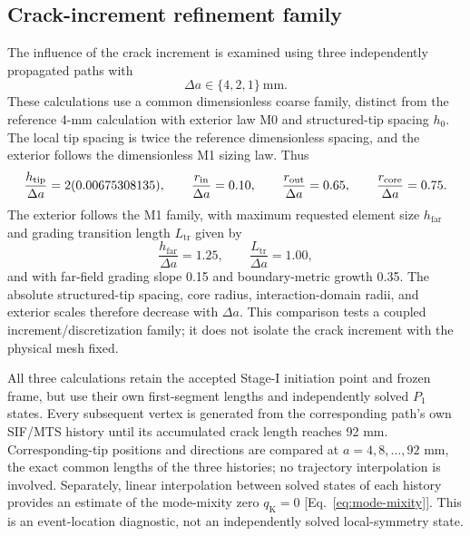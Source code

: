\documentclass[11pt]{article}
\begin{document}
\subsection{Crack-increment refinement family}
The influence of the crack increment is examined using
three independently propagated paths with
\[
 \Delta a\in\{4,2,1\}\ \mathrm{mm}.
\]
These calculations use a common dimensionless coarse family,
distinct from the reference 4-mm calculation with exterior law M0
and structured-tip spacing $h_0$. The local tip spacing is twice
the reference dimensionless spacing, and the exterior follows
the dimensionless M1 sizing law. Thus
\begin{equation}
 \frac{h_{\rm tip}}{\Delta a}
 =2(0.00675308135),\qquad
 \frac{r_{\mathrm{in}}}{\Delta a}=0.10,\qquad
 \frac{r_{\mathrm{out}}}{\Delta a}=0.65,\qquad
 \frac{r_{\mathrm{core}}}{\Delta a}=0.75.
 \label{eq:increment-family}
\end{equation}
The exterior follows the M1 family, with maximum requested
element size $h_{\mathrm{far}}$ and grading transition length
$L_{\mathrm{tr}}$ given by
\[
 \frac{h_{\mathrm{far}}}{\Delta a}=1.25,\qquad
 \frac{L_{\mathrm{tr}}}{\Delta a}=1.00,
\]
and with far-field grading slope 0.15 and boundary-metric
growth 0.35. The absolute structured-tip spacing, core
radius, interaction-domain radii, and exterior scales
therefore decrease with $\Delta a$. This comparison tests a
coupled increment/discretization family; it does not isolate
the crack increment with the physical mesh fixed.

All three calculations retain the accepted Stage-I initiation point
and frozen frame, but use their own first-segment lengths and
independently solved $P_1$ states. Every subsequent vertex is
generated from the corresponding path's own SIF/MTS history
until its accumulated crack length reaches 92 mm.
Corresponding-tip positions and directions are compared at
$a=4,8,\ldots,92$ mm, the exact common lengths of the three
histories; no trajectory interpolation is involved. Separately,
linear interpolation between solved states of each history provides
an estimate of the mode-mixity zero
$q_{\mathrm{K}}=0$ [Eq.~\eqref{eq:mode-mixity}]. This is an
event-location diagnostic, not an independently solved
local-symmetry state.
\end{document}
